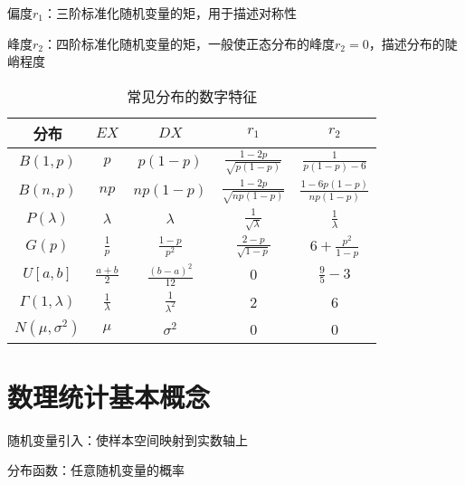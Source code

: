 \begin{notation}
    偏度$r_1$：三阶标准化随机变量的矩，用于描述对称性

    峰度$r_2$：四阶标准化随机变量的矩，一般使正态分布的峰度$r_2=0$，描述分布的陡峭程度
\end{notation}
\begin{table}[htpb]
    \centering
    \caption{常见分布的数字特征}
    \label{tab:常见分布的数字特征}
    \begin{tabular}{ccccc}
    \toprule
    分布 & $EX$ & $DX$ & $r_1$ & $r_2$\\
    \midrule
    $B\left( 1,p \right) $ & $p$ & $p\left( 1-p \right) $ & $\frac{1-2p}{\sqrt{p\left( 1-p \right) } } $ & $\frac{1}{p\left( 1-p \right) -6} $\\
    $B\left( n,p \right) $ & $np$ & $np\left( 1-p \right) $ & $\frac{1-2p}{\sqrt{np\left( 1-p \right) } } $ & $\frac{1-6p\left( 1-p \right) }{np\left( 1-p \right) } $ \\
    $P\left( \lambda \right) $ & $\lambda$ & $\lambda$ & $\frac{1}{\sqrt{\lambda} } $ & $\frac{1}{\lambda} $ \\
    $G\left( p \right) $ & $\frac{1}{p} $ & $\frac{1-p}{p^2} $ & $\frac{2-p}{\sqrt{1-p} } $ & $6+\frac{p^2}{1-p} $ \\
    $U[a,b]$ & $\frac{a+b}{2} $ & $\frac{\left( b-a \right) ^2}{12} $ & $0$ & $\frac{9}{5}-3 $ \\
    $\Gamma\left( 1,\lambda \right) $ & $\frac{1}{\lambda} $ & $\frac{1}{\lambda^2} $ & 2 & 6\\
    $N\left( \mu,\sigma^2 \right) $ & $\mu$ & $\sigma^2$ & 0 & 0\\
    \bottomrule
    \end{tabular}
\end{table}
\section{数理统计基本概念}%
\label{sec:数理统计基本概念}
随机变量引入：使样本空间映射到实数轴上

分布函数：任意随机变量的概率

